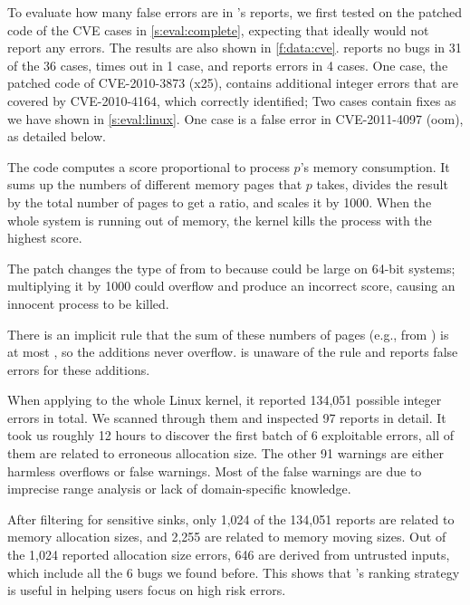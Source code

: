 To evaluate how many false errors are in \sys's reports,
we first tested \sys on the patched code of the CVE cases
in \autoref{s:eval:complete},
expecting that ideally \sys would not report any errors.
The results are also shown in \autoref{f:data:cve}.
\sys reports no bugs in 31 of the 36 cases, times out in 1 case, and
reports errors in 4 cases.
%
One case, the patched code of CVE-2010-3873 (x25),
contains additional integer errors that are covered by CVE-2010-4164,
which \sys correctly identified;
Two cases contain fixes as we have shown in \autoref{s:eval:linux}.
One case is a false error in CVE-2011-4097 (oom), as detailed below.

The code
computes a score proportional to process $p$'s memory consumption.
It sums up the numbers of different 
memory pages that $p$ takes, divides the result by the total number
of pages to get a ratio, and scales it by 1000.
When the whole system is running out of memory,
the kernel kills the process with the highest score.

The patch changes the type of  from  to  because
 could be large on 64-bit systems; multiplying it by
1000 could overflow and produce an incorrect score,
causing an innocent process to be killed.

There is an implicit rule that the sum of these numbers of pages
(e.g., from ) is at most , so the
additions never overflow.  \sys is unaware of the rule and
reports false errors for these additions.


When applying \sys to the whole Linux kernel, it reported 134,051 possible
integer errors in total. We scanned through them and inspected 97 reports in
detail.  It took us roughly 12 hours to discover the first batch of 6
exploitable errors, all of them are related to erroneous allocation size.
The other 91 warnings are either harmless overflows or
false warnings.  Most of the false warnings are due to imprecise range analysis
or lack of domain-specific knowledge.

After filtering for sensitive sinks, only 1,024 of the 134,051 reports are
related to memory allocation sizes, and 2,255 are related to memory moving
sizes. Out of the 1,024 reported allocation size errors, 646 are derived from
untrusted inputs, which include all the 6 bugs we found before.
This shows that \sys's ranking strategy is useful in helping
users focus on high risk errors.

